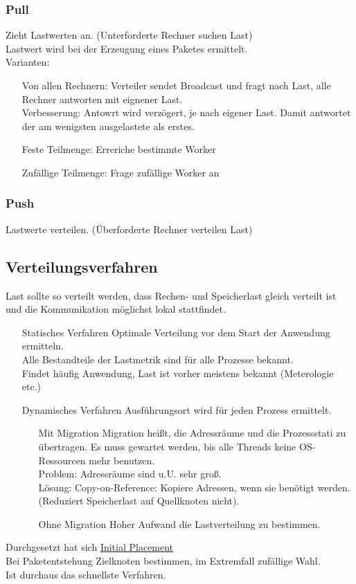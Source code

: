 \documentclass[a4paper]{article}
\begin{document}
\subsubsection*{Pull}
Zieht Lastwerten an. (Unterforderte Rechner suchen Last)\\
Lastwert wird bei der Erzeugung eines Paketes ermittelt.\\
Varianten:
\begin{itemize}
\item[Von allen Rechnern:] Verteiler sendet Broadcast und fragt nach Last, alle Rechner antworten mit eignener Last.\\
	Verbesserung: Antowrt wird verzögert, je nach eigener Last. Damit antwortet der am wenigsten ausgelastete als erstes.
\item[Feste Teilmenge:] Erreriche bestimmte Worker
\item[Zufällige Teilmenge:]Frage zufällige Worker an
\end{itemize}
\subsubsection*{Push}
Lastwerte verteilen.  (Überforderte Rechner verteilen Last)\\

\subsection{Verteilungsverfahren}
Last sollte so verteilt werden, dass Rechen- und Speicherlast gleich verteilt ist und die Kommunikation möglichst lokal stattfindet.
\begin{itemize}
\item[Statisches Verfahren] Optimale Verteilung vor dem Start der Anwendung ermitteln.\\ 
Alle Bestandteile der Lastmetrik sind für alle Prozesse bekannt.\\
Findet häufig Anwendung, Last ist vorher meistens bekannt (Meterologie etc.)
\item[Dynamisches Verfahren] Ausführungsort wird für jeden Prozess ermittelt. 
	\begin{itemize}
	\item[Mit Migration] Migration heißt, die Adressräume und die Prozessstati zu übertragen. Es muss gewartet werden, bis alle Threads keine OS-Ressourcen mehr benutzen.\\
	Problem: Adressräume sind u.U. sehr groß. \\
	Lösung: Copy-on-Reference: Kopiere Adressen, wenn sie benötigt werden. (Reduziert Speicherlast auf Quellknoten nicht).
	\item[Ohne Migration] Hoher Aufwand die Lastverteilung zu bestimmen.
	\end{itemize}
\end{itemize}
Durchgesetzt hat sich \underline{Initial Placement}\\
Bei Paketentstehung Zielknoten bestimmen, im Extremfall zufällige Wahl.\\
Ist durchaus das schnellste Verfahren.\\
\end{document}
